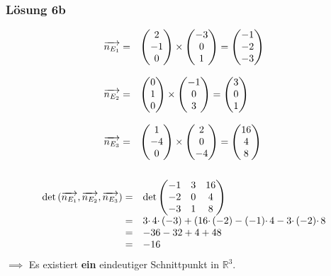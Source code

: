 \documentclass[main.tex]{subfiles}
\begin{document}
\subsubsection{Lösung 6b}

\begin{gather*}
\begin{array}{ r l }
\overrightarrow{n_{E_{1}}} = & \begin{pmatrix}
2\\
-1\\
0
\end{pmatrix} \times \begin{pmatrix}
-3\\
0\\
1
\end{pmatrix} =\begin{pmatrix}
-1\\
-2\\
-3
\end{pmatrix}\\
    & \\
\overrightarrow{n_{E_{2}}} = & \begin{pmatrix}
0\\
1\\
0
\end{pmatrix} \times \begin{pmatrix}
-1\\
0\\
3
\end{pmatrix} =\begin{pmatrix}
3\\
0\\
1
\end{pmatrix}\\
    & \\
\overrightarrow{n_{E_{3}}} = & \begin{pmatrix}
1\\
-4\\
0
\end{pmatrix} \times \begin{pmatrix}
2\\
0\\
-4
\end{pmatrix} =\begin{pmatrix}
16\\
4\\
8
\end{pmatrix}
\end{array}\\
\\
\begin{array}{ r l }
\det\left(\overrightarrow{n_{E_{1}}} ,\overrightarrow{n_{E_{2}}} ,\overrightarrow{n_{E_{3}}}\right) = & \det\begin{pmatrix}
-1 & 3 & 16\\
-2 & 0 & 4\\
-3 & 1 & 8
\end{pmatrix}\\
= & 3\cdotp 4\cdotp ( -3) +( 16\cdotp ( -2) -( -1) \cdotp 4-3\cdotp ( -2) \cdotp 8\\
= & -36-32+4+48\\
= & -16
\end{array}
\end{gather*}
$\implies$ Es existiert \textbf{ein} eindeutiger Schnittpunkt in $\mathbb{R}^{3}$.
\end{document}
